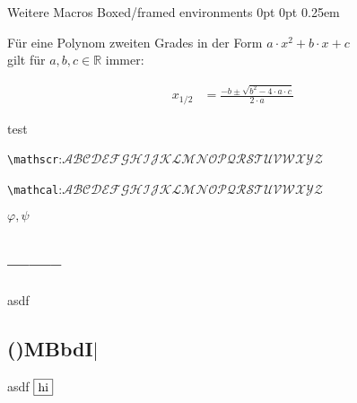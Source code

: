 \documentclass[
    ngerman,
    color=1b,
    load_common,
    submission,
    dark_mode,
    boxarc,
    fleqn,
    T1,
]{rubos-tuda-template}
\begin{document}
\begin{task}[points=2,solution=true]{Weitere Macros}
    Boxed/framed environments
    {0pt}%
    {0pt}%
    {\normalfont}%
    {}%
    {\small\bfseries\sffamily\color{accentcolor}}%
    {\;}%
    {0.25em}%
    {
        \small\sffamily\color{accentcolor}\space{}%
    }
    \begin{definition}[Mitternachtsformel] Für eine Polynom zweiten Grades in der Form $a\cdot x^2+b\cdot x + c$ \\gilt für $a,b,c \in \mathbb{R}$ immer:%

        \begin{align}
            x_{1/2} & =\frac{-b\pm\sqrt{b^{2}-4\cdot a \cdot c}}{2\cdot a}
        \end{align}

    \end{definition}
    \begin{definition}
        test
    \end{definition}
    \verb+\mathscr+:$\mathscr{ABCDEFGHIJKLMNOPQRSTUVWXYZ}$

    \verb+\mathcal+:$\mathcal{ABCDEFGHIJKLMNOPQRSTUVWXYZ}$

    $\varphi, \psi$

    \begin{minipage}[t]{.5\textwidth-1pt}
        \subsection{--------} %
        asdf
    \end{minipage}\hspace{2pt}%
    \begin{minipage}[t]{.5\textwidth-1pt}
        \subsection{\texorpdfstring{()MBbdI$\vert$}{()MBbdI|}} %
        asdf $\vcenter{\hbox{\tikz{\node[draw]{hi};}}}$
    \end{minipage}
\end{task}
\end{document}
